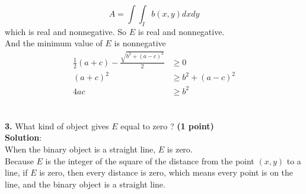 \documentclass[letterpaper,flegn,12pt]{extarticle}
\begin{document}
\begin{equation}
\nonumber A = \int\int_I b(x, y)dxdy
\end{equation}
which is real and nonnegative.
So $E$ is real and nonnegative.
\\ And the minimum value of $E$ is nonnegative
\begin{equation}
\begin{aligned}
\nonumber \frac{1}{2}(a+c) - \frac{\sqrt{b^2+(a-c)^2}}{2} &\geq 0 \\
(a+c)^2 &\geq b^2 + (a-c)^2 \\
4ac &\geq b^2 
\end{aligned}
\end{equation}
~\\
\\\textbf{3.} What kind of object gives $E$ equal to zero ? \textbf{(1 point)}
\\ \textbf{Solution}:
\\When the binary object is a straight line, $E$ is zero.
\\Because $E$ is the integer of the square of the distance from the point $(x, y)$ to a line, if $E$ is zero, then every distance is zero, which means every point is on the line, and the binary object is a straight line.
\end{document}
